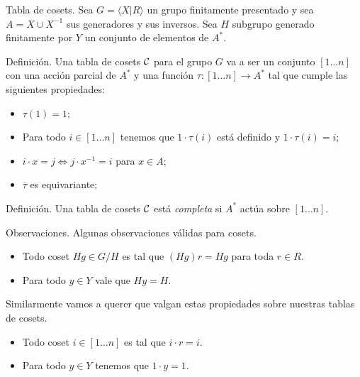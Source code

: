 \documentclass[aspectratio=169, 9pt]{beamer}
\newcommand{\fp}{finitamente presentado }
\newcommand{\In}{[1 \dots n]}
\newcommand{\ol}{\overline}
\newcommand{\Co}{{\cal{C}}}
\begin{document}
\begin{frame}[fragile]{Tabla de cosets.}
Sea $G = \langle X | R \rangle$ un grupo \fp y sea $A = X \cup X^{-1}$ sus generadores y sus inversos.
Sea $H$ subgrupo generado finitamente por $Y$ un conjunto de elementos de $A^*$.
\pause
\begin{alertblock}{Definición.}
	Una tabla de cosets $\Co $ para el grupo $G$ va a ser un conjunto $\In$ con una acción parcial de $A^{*}$ y una función $\tau: \In \to A^*$ tal que cumple las siguientes propiedades:
	\begin{itemize}
		\item $\tau(1)  = 1$;
		\item Para todo $i \in \In$ tenemos que $1\cdot {\tau(i)}$ está definido y $1\cdot {\tau(i)} = i$;
		\item $i \cdot x = j \iff j \cdot x^{-1} = i$ para $x \in A$;
		\item $\ol \tau$ es equivariante;
	\end{itemize}	
\end{alertblock}
\pause
%	


\begin{alertblock}{Definición.}
	Una tabla de cosets $\Co$ está \emph{completa} si $A^*$ actúa sobre $\In$.
\end{alertblock}
\pause
\end{frame}

\begin{frame}[fragile]{Observaciones.}
	Algunas observaciones válidas para cosets.
	\pause
	\begin{itemize}		
		\item Todo coset $Hg \in G/H$ es tal que $(Hg)r = Hg$ para toda $r \in R$.
		
		\item Para todo $y \in Y$ vale que $Hy = H$.
	\end{itemize}	
	\pause
	Similarmente vamos a querer que valgan estas propiedades sobre nuestras tablas de cosets.
	\begin{itemize}
		\item Todo coset $i \in \In$ es tal que $i \cdot r = i$.
		
		\item Para todo $y \in Y$ tenemos que $1 \cdot y = 1$.
	\end{itemize}
\end{frame}
\end{document}
